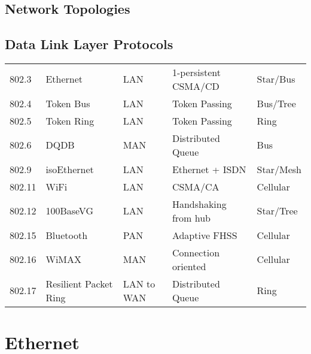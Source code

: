 \documentclass{report}
\begin{document}
\subsection*{Network Topologies}

\subsection*{Data Link Layer Protocols}
\begin{center}
	\begin{tabular}{l l l l l}
		802.3  & Ethernet              & LAN        & 1-persistent CSMA/CD & Star/Bus  \\
		802.4  & Token Bus             & LAN        & Token Passing        & Bus/Tree  \\
		802.5  & Token Ring            & LAN        & Token Passing        & Ring      \\
		802.6  & DQDB                  & MAN        & Distributed Queue    & Bus       \\
		802.9  & isoEthernet           & LAN        & Ethernet + ISDN      & Star/Mesh \\
		802.11 & WiFi                  & LAN        & CSMA/CA              & Cellular  \\
		802.12 & 100BaseVG             & LAN        & Handshaking from hub & Star/Tree \\
		802.15 & Bluetooth             & PAN        & Adaptive FHSS        & Cellular  \\
		802.16 & WiMAX                 & MAN        & Connection oriented  & Cellular  \\
		802.17 & Resilient Packet Ring & LAN to WAN & Distributed Queue    & Ring      \\
	\end{tabular}
\end{center}

\section*{Ethernet}
\end{document}
